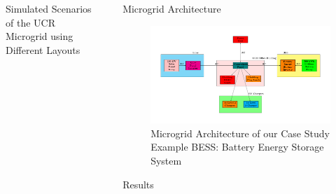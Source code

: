 \documentclass[final, 20 pt]{beamer}
\newlength{\sepwid}
\newlength{\onecolwid}
\newlength{\twocolwid}
\begin{document}
\begin{frame}[t]
\begin{columns}[t]
\begin{column}{\onecolwid}
\begin{block}{Simulated Scenarios of the UCR Microgrid using Different Layouts}
\end{block}


\end{column} %

\begin{column}{\sepwid}\end{column} %

\begin{column}{\twocolwid} %


\begin{block}{Microgrid Architecture}
	\begin{figure}[!htb] 		
		\includegraphics[width=0.5\linewidth]{Fig/power_system_setup_modelica}
		\caption{Microgrid Architecture of our Case Study Example BESS: Battery Energy Storage System}
		\label{fig:powersystemsetupfull}
	\end{figure}
\end{block}

\begin{block}{Results}
	
	

\end{block}
\end{column}
\end{columns}
\end{frame}
\end{document}
